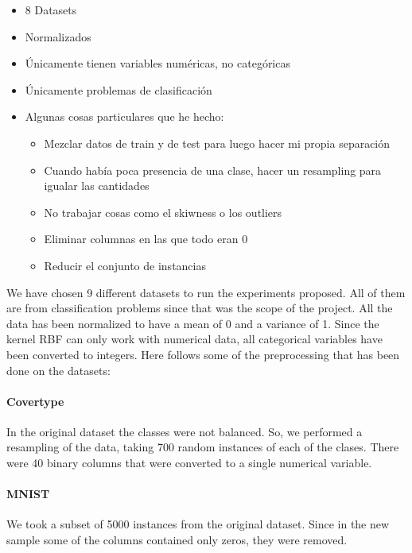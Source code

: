 \begin{note}
  \begin{itemize}
    \item 8 Datasets
    \item Normalizados
    \item Únicamente tienen variables numéricas, no categóricas
    \item Únicamente problemas de clasificación
    \item Algunas cosas particulares que he hecho:
    \begin{itemize}
      \item Mezclar datos de train y de test para luego hacer mi propia
      separación
      \item Cuando había poca presencia de una clase, hacer un resampling para
      igualar las cantidades
      \item No trabajar cosas como el skiwness o los outliers
      \item Eliminar columnas en las que todo eran 0
      \item Reducir el conjunto de instancias
    \end{itemize}
  \end{itemize}
\end{note}

\begin{pre-delivery}
  We have chosen 9 different datasets to run the experiments proposed. All of
  them are from classification problems since that was the scope of the project.
  All the data has been normalized to have a mean of 0 and a variance of 1. Since
  the kernel RBF can only work with numerical data, all categorical variables
  have been converted to integers. Here follows some of the preprocessing that
  has been done on the datasets:
  \paragraph{Covertype}
  In the original dataset the classes were not balanced. So, we performed a
  resampling of the data, taking 700 random instances of each of the clases.
  There were 40 binary columns that were converted to a single numerical
  variable.
  \paragraph{MNIST}
  We took a subset of 5000 instances from the original dataset. Since in the new
  sample some of the columns contained only zeros, they were removed.
\end{pre-delivery}
